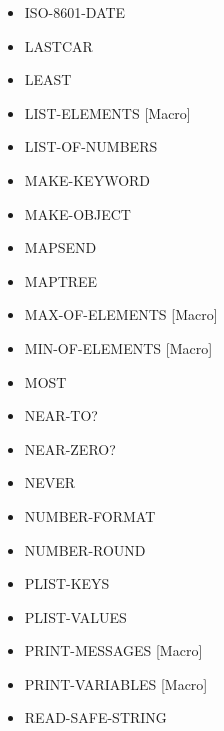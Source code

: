 \documentclass [11pt]{book}
\begin{document}
\begin{itemize}
\item {}ISO-8601-DATE

\item {}LASTCAR

\item {}LEAST

\item {}LIST-ELEMENTS [Macro]

\item {}LIST-OF-NUMBERS

\item {}MAKE-KEYWORD

\item {}MAKE-OBJECT

\item {}MAPSEND

\item {}MAPTREE

\item {}MAX-OF-ELEMENTS [Macro]

\item {}MIN-OF-ELEMENTS [Macro]

\item {}MOST

\item {}NEAR-TO?

\item {}NEAR-ZERO?

\item {}NEVER

\item {}NUMBER-FORMAT

\item {}NUMBER-ROUND

\item {}PLIST-KEYS

\item {}PLIST-VALUES

\item {}PRINT-MESSAGES [Macro]

\item {}PRINT-VARIABLES [Macro]

\item {}READ-SAFE-STRING


\end{itemize}
\end{document}

